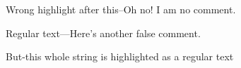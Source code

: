 

{ Wrong highlight after this--Oh no! I am no comment. }

Regular text---Here's another false comment.

But-this whole string is highlighted as a regular text


